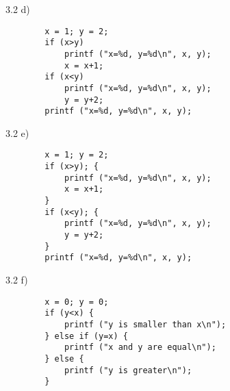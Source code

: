 \documentclass{beamer}
\begin{document}
\begin{frame}[fragile]{3.2 d)}
    \begin{verbatim}
        x = 1; y = 2;
        if (x>y)
            printf ("x=%d, y=%d\n", x, y);
            x = x+1;
        if (x<y)
            printf ("x=%d, y=%d\n", x, y);
            y = y+2;
        printf ("x=%d, y=%d\n", x, y);
    \end{verbatim}
\end{frame}

\begin{frame}[fragile]{3.2 e)}
    \begin{verbatim}
        x = 1; y = 2;
        if (x>y); {
            printf ("x=%d, y=%d\n", x, y);
            x = x+1;
        }
        if (x<y); {
            printf ("x=%d, y=%d\n", x, y);
            y = y+2;
        }
        printf ("x=%d, y=%d\n", x, y);
    \end{verbatim}
\end{frame}

\begin{frame}[fragile]{3.2 f)}
    \begin{verbatim}
        x = 0; y = 0;
        if (y<x) {
            printf ("y is smaller than x\n");
        } else if (y=x) {
            printf ("x and y are equal\n");
        } else {
            printf ("y is greater\n");
        }
    \end{verbatim}
\end{frame}
\end{document}
